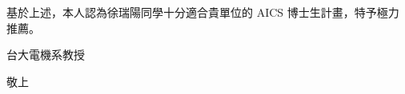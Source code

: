 \documentclass[14pt,UTF8,fntef]{memoir}
\begin{document}

\vspace{1.5em}

基於上述，本人認為徐瑞陽同學十分適合貴單位的 AICS 博士生計畫，特予極力推薦。

\begin{flushright}
台大電機系教授
\vspace{2.5em}

敬上
\end{flushright}
\end{document}
